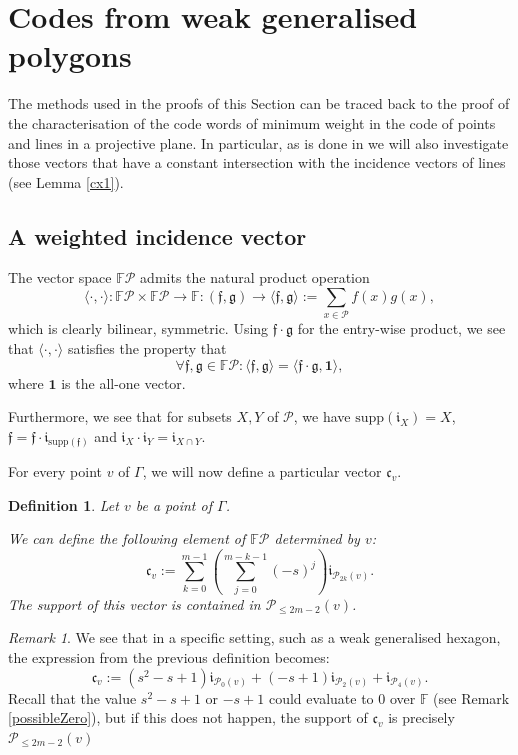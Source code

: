 \documentclass[12pt]{article}
\newcommand{\F}{\mathbb{F}}
\newcommand{\Points}{\mathcal{P}}
\newcommand{\FP}{\F\Points}
\newcommand{\f}{\mathfrak{f}}
\newcommand{\g}{\mathfrak{g}}
\renewcommand{\i}{\mathfrak{i}}
\newcommand{\cv}{\mathfrak{c}_{v}}
\newtheorem{definition}{Definition}
\theoremstyle{remark}
\newtheorem{remark}{Remark}
\begin{document}
\section{Codes from weak generalised polygons}
The methods used in the proofs of this Section can be traced back to the proof of the characterisation of the code words of minimum weight in the code of points and lines in a projective plane. In particular, as is done in \cite[Theorem 6.3.1]{AssmusAndKey} we will also investigate those vectors that have a constant intersection with the incidence vectors of lines (see Lemma \ref{cx1}).


\subsection{A weighted incidence vector}
The vector space \(\FP\) admits the natural product operation \[\langle \cdot, \cdot \rangle: \FP\times\FP \to \F :(\f,\g)\to \langle \f, \g \rangle := \sum_{x\in\Points}f(x)g(x),\] which is clearly bilinear, symmetric. Using $\f\cdot \g$ for the entry-wise product, we see that $\langle \cdot,\cdot\rangle$ satisfies the property that \[\forall \mathfrak{f}, \mathfrak{g} \in \FP: \langle \mathfrak{f}, \mathfrak{g}\rangle  = \langle \f\cdot\g, \mathbf{1}\rangle,\] where \(\mathbf{1}\) is the all-one vector.

Furthermore, we see that for subsets $X,Y$ of $\Points$, we have
 \(\text{supp}(\i_X) = X\),
		 \(\f = \f\cdot\i_{\text{supp}(\f)}\)
		and \(\i_X\cdot \i_Y = \i_{X\cap Y}\).
	

For every point $v$ of $\Gamma$, we will now define a particular vector $\cv$.
\begin{definition}\label{cxDef}
	Let \(v\) be a point of \(\Gamma\). 
	
	We can define the following element of \(\FP\) determined by \(v\):
	\[\cv := \sum_{k=0}^{m-1} \left(\sum_{j=0}^{m-k-1} (-s)^{j}\right)\mathfrak{i}_{\Points_{2k}(v)}. \]
	The support of this vector is contained in \(\Points_{\le 2m-2}(v)\). 
\end{definition}

\begin{remark}
We see that in a specific setting, such as a weak generalised hexagon, the expression from the previous definition becomes: 
\[\cv := (s^2-s+1)\i_{\Points_0(v)} + (-s+1)\i_{\Points_2(v)}+ \i_{\Points_4(v)}. \]
Recall that the value \(s^2-s+1\) or \(-s+1\) could evaluate to \(0\) over \(\F\) (see Remark \ref{possibleZero}), but if this does not happen, the support of $\cv$ is precisely $\Points_{\le 2m-2}(v)$
\end{remark}
\end{document}
